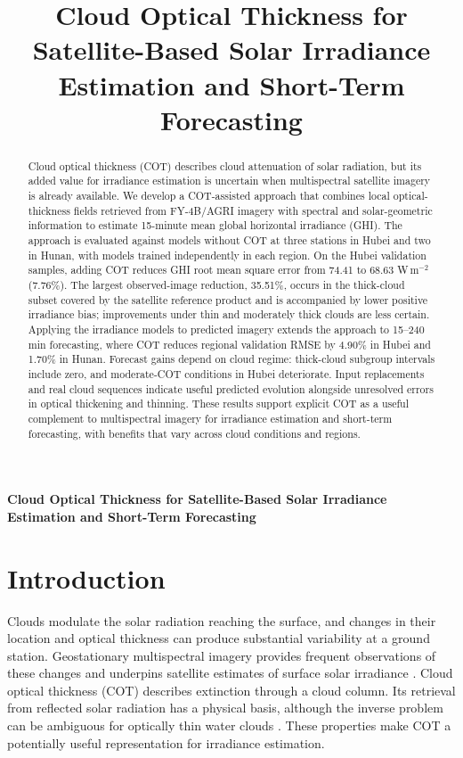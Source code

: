 \documentclass[11pt]{article}
\title{Cloud Optical Thickness for Satellite-Based Solar Irradiance Estimation and Short-Term Forecasting}
\author{}\date{}
\begin{document}
\begin{center}\LARGE\bfseries
Cloud Optical Thickness for Satellite-Based Solar Irradiance Estimation and Short-Term Forecasting
\end{center}
\begin{abstract}
Cloud optical thickness (COT) describes cloud attenuation of solar radiation, but its added value for irradiance estimation is uncertain when multispectral satellite imagery is already available. We develop a COT-assisted approach that combines local optical-thickness fields retrieved from FY-4B/AGRI imagery with spectral and solar-geometric information to estimate 15-minute mean global horizontal irradiance (GHI). The approach is evaluated against models without COT at three stations in Hubei and two in Hunan, with models trained independently in each region. On the Hubei validation samples, adding COT reduces GHI root mean square error from 74.41 to 68.63 W\,m$^{-2}$ (7.76\%). The largest observed-image reduction, 35.51\%, occurs in the thick-cloud subset covered by the satellite reference product and is accompanied by lower positive irradiance bias; improvements under thin and moderately thick clouds are less certain. Applying the irradiance models to predicted imagery extends the approach to 15--240 min forecasting, where COT reduces regional validation RMSE by 4.90\% in Hubei and 1.70\% in Hunan. Forecast gains depend on cloud regime: thick-cloud subgroup intervals include zero, and moderate-COT conditions in Hubei deteriorate. Input replacements and real cloud sequences indicate useful predicted evolution alongside unresolved errors in optical thickening and thinning. These results support explicit COT as a useful complement to multispectral imagery for irradiance estimation and short-term forecasting, with benefits that vary across cloud conditions and regions.
\end{abstract}

\section{Introduction}
Clouds modulate the solar radiation reaching the surface, and changes in their location and optical thickness can produce substantial variability at a ground station. Geostationary multispectral imagery provides frequent observations of these changes and underpins satellite estimates of surface solar irradiance \cite{huang2019}. Cloud optical thickness (COT) describes extinction through a cloud column. Its retrieval from reflected solar radiation has a physical basis, although the inverse problem can be ambiguous for optically thin water clouds \cite{nakajima1990}. These properties make COT a potentially useful representation for irradiance estimation.
\end{document}
